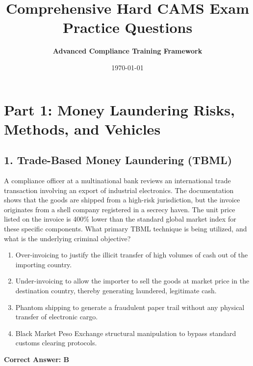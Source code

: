 \documentclass[11pt,a4paper]{article}
\title{\textbf{Comprehensive Hard CAMS Exam Practice Questions}}
\author{\textbf{Advanced Compliance Training Framework}}
\date{\today}
\begin{document}
	
	\maketitle
	
	\section{Part 1: Money Laundering Risks, Methods, and Vehicles}
	
	\subsection{1. Trade-Based Money Laundering (TBML)}
	A compliance officer at a multinational bank reviews an international trade transaction involving an export of industrial electronics. The documentation shows that the goods are shipped from a high-risk jurisdiction, but the invoice originates from a shell company registered in a secrecy haven. The unit price listed on the invoice is 400\% lower than the standard global market index for these specific components. What primary TBML technique is being utilized, and what is the underlying criminal objective?
	\begin{enumerate}[label=\Alph*.]
		\item Over-invoicing to justify the illicit transfer of high volumes of cash out of the importing country.
		\item Under-invoicing to allow the importer to sell the goods at market price in the destination country, thereby generating laundered, legitimate cash.
		\item Phantom shipping to generate a fraudulent paper trail without any physical transfer of electronic cargo.
		\item Black Market Peso Exchange structural manipulation to bypass standard customs clearing protocols.
	\end{enumerate}
	\textbf{Correct Answer: B}
	
\end{document}

